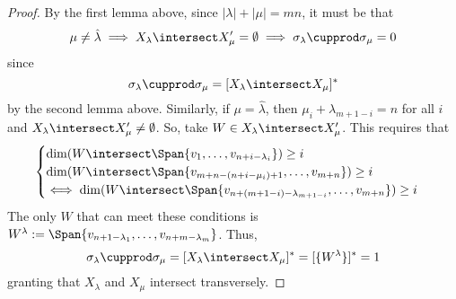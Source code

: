 \documentclass[11pt,leqno,oneside]{amsart}
\numberwithin{thm}{section}
\begin{document}
\begin{proof}
  By the first lemma above, since \(|\lambda|+|\mu| = mn\), it must be
  that \[
    \mu \neq \hat{\lambda} \implies X_\lambda \intersect X_\mu' =
    \emptyset \implies \sigma_\lambda \cupprod \sigma_\mu = 0
  \]
  since \[
    \sigma_\lambda \cupprod \sigma_\mu = [X_\lambda \intersect X_\mu]^*
  \]
  by the second lemma above. Similarly, if \(\mu = \hat{\lambda}\),
  then \(\mu_i + \lambda_{m+1-i} = n\) for all \(i\) and \(X_\lambda
  \intersect X_\mu' \neq \emptyset\). So, take \(W \in X_\lambda
  \intersect X_\mu'\). This requires that  \[
    \begin{cases}
      \dim(W \intersect \Span\{v_1, \ldots, v_{n+i-\lambda_i}\}) \geq i \\
      \dim(W \intersect \Span\{v_{m+n-(n+i-\mu_i)+1}, \ldots,
      v_{m+n}\}) \geq i \\
      \iff \dim(W \intersect
      \Span\{v_{n+(m+1-i)-\lambda_{m+1-i}}, \ldots, v_{m+n}\}) \geq i
    \end{cases}
  \]
  The only \(W\) that can meet these conditions is \(W^\lambda :=
  \Span\{v_{n+1-\lambda_1}, \ldots, v_{n+m-\lambda_m}\}\). Thus, \[
    \sigma_\lambda \cupprod \sigma_\mu = [X_\lambda \intersect
    X_\mu]^* = [\{W^\lambda\}]^* = 1
  \]
  granting that \(X_\lambda\) and \(X_\mu\) intersect transversely.
\end{proof}
\begin{bibdiv}
  \begin{biblist}
  \end{biblist}
\end{bibdiv}
\end{document}
